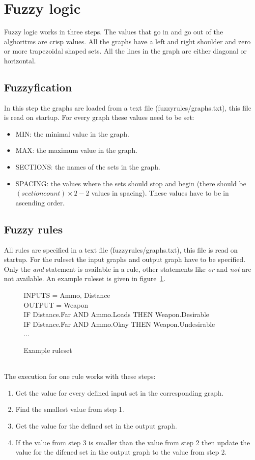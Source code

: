 \documentclass{article}
\begin{document}
    \newpage
   \section {Fuzzy logic}
   Fuzzy logic works in three steps. The values that go in and go out of the alghoritms are crisp values. All the graphs have a left and right shoulder and zero or more trapezoidal shaped sets. All the lines in the graph are either diagonal or horizontal.
   \subsection{Fuzzyfication}
   In this step the graphs are loaded from a text file (fuzzyrules/graphs.txt), this file is read on startup. For every graph these values need to be set: 
   \begin{itemize}
   \item MIN: the minimal value in the graph.
   \item MAX: the maximum value in the graph.
   \item SECTIONS: the names of the sets in the graph.
   \item SPACING: the values where the sets should stop and begin (there should be \( (section count) \times 2 - 2\) values in spacing). These values have to be in ascending order.
   \end{itemize}
   \subsection{Fuzzy rules}
   All rules are specified in a text file (fuzzyrules/graphs.txt), this file is read on startup. For the ruleset the input graphs and output graph have to be specified. Only the \emph{and} statement is available in a rule, other statements like \emph{or} and \emph{not} are not available. An example ruleset is given in figure~\ref{fig:ruleset}.
   \begin{figure}[h!]
   {\ttfamily 
   		INPUTS = Ammo, Distance\\
  	 	OUTPUT = Weapon\\
   		IF Distance.Far AND Ammo.Loads THEN Weapon.Desirable \\
   		IF Distance.Far	AND Ammo.Okay THEN Weapon.Undesirable \\
   		...
   }
   \caption{Example ruleset}
   \label{fig:ruleset}
   \end{figure}\\
   The execution for one rule works with these steps:
   \begin{enumerate}
   \item Get the value for every defined input set in the corresponding graph.
   \item Find the smallest value from step 1.
   \item Get the value for the defined set in the output graph.
   \item If the value from step 3 is smaller than the value from step 2 then update the value for the difened set in the output graph to the value from step 2.
   \end{enumerate}
\end{document}
